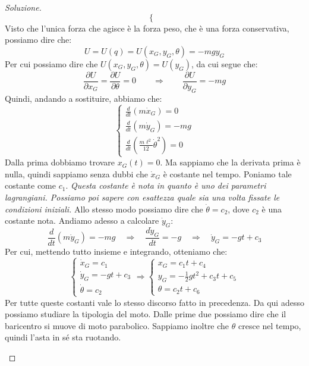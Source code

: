 \documentclass[11pt,a4paper,twoside]{article}
\theoremstyle{definition}
\newenvironment{sol}
	{\renewcommand\qedsymbol{$\blacksquare$}\begin{proof}[Soluzione]}
	{\end{proof}}
\begin{document}
\begin{sol}
\[\begin{cases}
	\end{cases}\]
	Visto che l'unica forza che agisce è la forza peso, che è una forza conservativa, possiamo dire che:
	\[ U=U(q) = U(x_G, y_G, \theta) = -mgy_G \]
	Per cui possiamo dire che $U(x_G, y_G, \theta) = U(y_G)$, da cui segue  che:
	\[ \frac{\partial U}{\partial x_G} = \frac{\partial U}{\partial \theta} = 0 \qquad \Rightarrow \qquad \frac{\partial U}{\partial y_G} = -mg \]
	Quindi, andando a sostituire, abbiamo che:
	\[
		\begin{cases}
			\frac{d}{dt}(m \dot x_G)=0\\
			\frac{d}{dt}(m \dot y_G)=-mg\\
			\frac{d}{dt}\left( \frac{m\ell^2}{12}\dot \theta^2 \right) = 0
		\end{cases}
	\]
	Dalla prima dobbiamo trovare $x_G(t)=0$. Ma sappiamo che la derivata prima è nulla, quindi sappiamo senza dubbi che $\dot x_G$ è costante nel tempo. Poniamo tale costante come $c_1$. \textit{Questa costante è nota in quanto è uno dei parametri lagrangiani. Possiamo poi sapere con esattezza quale sia una volta fissate le condizioni iniziali.} Allo stesso modo possiamo dire che $\dot \theta = c_2$, dove $c_2$ è una costante nota. Andiamo adesso a calcolare $\dot y_G$:
	\[ \frac{d}{dt}(m\dot y_G) = -mg \quad \Rightarrow \quad \frac{d \dot y_G}{dt} = -g \quad \Rightarrow \quad \dot y_G = -gt + c_3 \]
	Per cui, mettendo tutto insieme e integrando, otteniamo che:
	\[
		\begin{cases}
			\dot x_G = c_1\\
			\dot y_G = -gt + c_3\\
			\dot \theta = c_2
		\end{cases} \Rightarrow \begin{cases}
			x_G = c_1t + c_4\\
			y_G = -\frac 12 gt^2 + c_3t + c_5\\
			\theta = c_2t + c_6
		\end{cases}
	\]
	Per tutte queste costanti vale lo stesso discorso fatto in precedenza. Da qui adesso possiamo studiare la tipologia del moto. Dalle prime due possiamo dire che il baricentro si muove di moto parabolico. Sappiamo inoltre che $\theta$ cresce nel tempo, quindi l'asta in sé sta ruotando.
	\begin{center}
	\end{center}
\end{sol}
\end{document}
